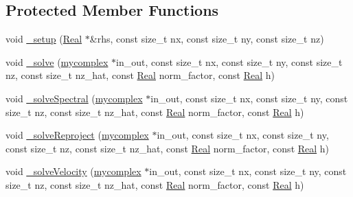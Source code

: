 \subsection*{Protected Member Functions}
\begin{DoxyCompactItemize}
\item 
void \hyperlink{class_poisson_solver_vector_f_f_t_w_adcd7c736fd7735c09a2f36732f1afed4}{\+\_\+setup} (\hyperlink{_h_d_f5_dumper_8h_a445a5f0e2a34c9d97d69a3c2d1957907}{Real} $\ast$\&rhs, const size\+\_\+t nx, const size\+\_\+t ny, const size\+\_\+t nz)
\item 
void \hyperlink{class_poisson_solver_vector_f_f_t_w_a2e8fb75577bda2e3e660ac3af73c2ef2}{\+\_\+solve} (\hyperlink{_poisson_solver_scalar_f_f_t_w_8h_a0ffff0c33f8a11fdc4272b2dad05f485}{mycomplex} $\ast$in\+\_\+out, const size\+\_\+t nx, const size\+\_\+t ny, const size\+\_\+t nz, const size\+\_\+t nz\+\_\+hat, const \hyperlink{_h_d_f5_dumper_8h_a445a5f0e2a34c9d97d69a3c2d1957907}{Real} norm\+\_\+factor, const \hyperlink{_h_d_f5_dumper_8h_a445a5f0e2a34c9d97d69a3c2d1957907}{Real} h)
\item 
void \hyperlink{class_poisson_solver_vector_f_f_t_w_aba70e32d3671e7ce88c34d37e7e43232}{\+\_\+solve\+Spectral} (\hyperlink{_poisson_solver_scalar_f_f_t_w_8h_a0ffff0c33f8a11fdc4272b2dad05f485}{mycomplex} $\ast$in\+\_\+out, const size\+\_\+t nx, const size\+\_\+t ny, const size\+\_\+t nz, const size\+\_\+t nz\+\_\+hat, const \hyperlink{_h_d_f5_dumper_8h_a445a5f0e2a34c9d97d69a3c2d1957907}{Real} norm\+\_\+factor, const \hyperlink{_h_d_f5_dumper_8h_a445a5f0e2a34c9d97d69a3c2d1957907}{Real} h)
\item 
void \hyperlink{class_poisson_solver_vector_f_f_t_w_a0b8eb758fcecaaa5f4d8332cdb1dc735}{\+\_\+solve\+Reproject} (\hyperlink{_poisson_solver_scalar_f_f_t_w_8h_a0ffff0c33f8a11fdc4272b2dad05f485}{mycomplex} $\ast$in\+\_\+out, const size\+\_\+t nx, const size\+\_\+t ny, const size\+\_\+t nz, const size\+\_\+t nz\+\_\+hat, const \hyperlink{_h_d_f5_dumper_8h_a445a5f0e2a34c9d97d69a3c2d1957907}{Real} norm\+\_\+factor, const \hyperlink{_h_d_f5_dumper_8h_a445a5f0e2a34c9d97d69a3c2d1957907}{Real} h)
\item 
void \hyperlink{class_poisson_solver_vector_f_f_t_w_a04566e264ed8447f4f8d4d6753443a27}{\+\_\+solve\+Velocity} (\hyperlink{_poisson_solver_scalar_f_f_t_w_8h_a0ffff0c33f8a11fdc4272b2dad05f485}{mycomplex} $\ast$in\+\_\+out, const size\+\_\+t nx, const size\+\_\+t ny, const size\+\_\+t nz, const size\+\_\+t nz\+\_\+hat, const \hyperlink{_h_d_f5_dumper_8h_a445a5f0e2a34c9d97d69a3c2d1957907}{Real} norm\+\_\+factor, const \hyperlink{_h_d_f5_dumper_8h_a445a5f0e2a34c9d97d69a3c2d1957907}{Real} h)
\end{DoxyCompactItemize}
